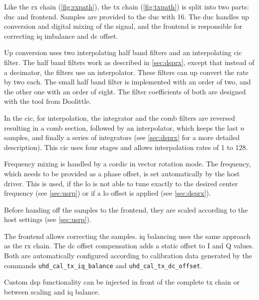 \documentclass[12pt,a4paper,parskip=full,abstracton]{scrartcl}
\begin{document}
Like the \gls{rx} chain (\cref{fig:rxpath}), the \gls{tx} chain (\cref{fig:txpath})
is split into two parts: \gls{duc} and frontend. Samples are provided to the \gls{duc}
with \SI{16}{\bit}. The \gls{duc} handles up conversion and digital mixing of the signal,
and the frontend is responsible for correcting \gls{iq} imbalance and \gls{dc} offset.

Up conversion uses two interpolating half band filters and an interpolating \gls{cic}
filter. The half band filters work as described in \cref{sec:dsprx}, except that
instead of a decimator, the filters use an interpolator. These filters can up
convert the rate by two each. The small half band filter is implemented with an order of two,
and the other one with an order of eight. The filter coefficients of both are designed
with the tool from Doolittle\cite{halfband}.

In the \gls{cic}, for interpolation, the integrator and the comb filters are reversed resulting in
a comb section, followed by an interpolator, which keeps the last $n$ samples,
and finally a series of integrators (see \cref{sec:dsprx} for a more detailed
description). This \gls{cic} uses four stages and allows interpolation rates of 1 to 128.

Frequency mixing is handled by a \gls{cordic} in vector rotation mode. The frequency,
which needs to be provided as a phase offset, is set automatically by the host driver.
This is used, if the \gls{lo} is not able to tune exactly to the desired center frequency
(see \cref{sec:usrp}) or if a \gls{lo} offset is applied (see \cref{sec:dsprx}).

Before handing off the samples to the frontend, they are scaled according to the
host settings (see \cref{sec:usrp}).

The frontend allows correcting the samples. \Gls{iq} balancing uses the same
approach as the \gls{rx} chain. The \gls{dc} offset compensation adds a
static offset to I and Q values. Both are automatically configured according
to calibration data generated by the commands
\verb+uhd_cal_tx_iq_balance+ and \verb+uhd_cal_tx_dc_offset+\cite{usrp_cal}.

Custom \gls{dsp} functionality can be injected in front of the complete \gls{tx} chain or between
scaling and \gls{iq} balance.

\end{document}
